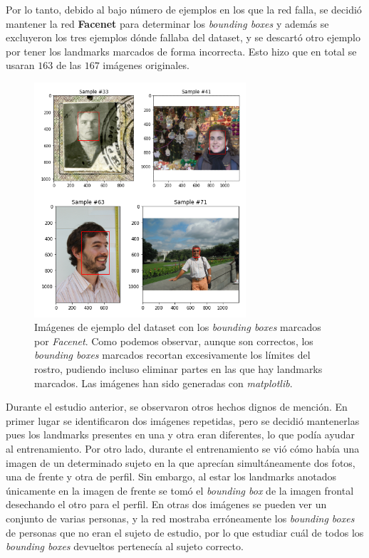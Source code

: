             \medskip

            \noindent Por lo tanto, debido al bajo número de ejemplos en los que la red falla, se decidió mantener la red \textbf{Facenet} para determinar los \textit{bounding boxes} y además se excluyeron los tres ejemplos dónde fallaba del dataset, y se descartó otro ejemplo por tener los landmarks marcados de forma incorrecta. Esto hizo que en total se usaran $163$ de las $167$ imágenes originales.

            \medskip 

            \begin{figure}[H]
                \centering
                \includegraphics[width=0.7\textwidth]{img/imagenes_ejemplo_bb.png}
                \caption{Imágenes de ejemplo del dataset con los \textit{bounding boxes} marcados por \textit{Facenet}. Como podemos observar, aunque son correctos, los \textit{bounding boxes} marcados recortan excesivamente los límites del rostro, pudiendo incluso eliminar partes en las que hay landmarks marcados. Las imágenes han sido generadas con \textit{matplotlib}.}
                \label{fig:Ejemplo_bb}
            \end{figure}

            \noindent Durante el estudio anterior, se observaron otros hechos dignos de mención. En primer lugar se identificaron dos imágenes repetidas, pero se decidió mantenerlas pues los landmarks presentes en una y otra eran diferentes, lo que podía ayudar al entrenamiento. Por otro lado, durante el entrenamiento se vió cómo había una imagen de un determinado sujeto en la que aprecían simultáneamente dos fotos, una  de frente y otra de perfil. Sin embargo, al estar los landmarks anotados únicamente en la imagen de frente se tomó el \textit{bounding box} de la imagen frontal desechando el otro para el perfil. En otras dos imágenes se pueden ver un conjunto de varias personas, y la red mostraba erróneamente los \textit{bounding boxes} de personas que no eran el sujeto de estudio, por lo que estudiar cuál de todos los \textit{bounding boxes} devueltos pertenecía al sujeto correcto.

